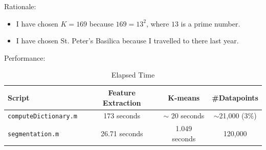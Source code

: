 \documentclass{article}
\begin{document}
Rationale: 
\begin{itemize}\parskip0pt
	\item I have chosen $K=169$ because $169=13^2$, where $13$ is a prime number. 
	\item I have chosen St. Peter's Basilica because I travelled to there last year. 
\end{itemize}

Performance: 
\begin{table}[h!]
	\centering
	\caption{Elapsed Time}\vspace{4pt}
	\begin{tabular}{lccc} \toprule
		Script & Feature Extraction & K-means & \#Datapoints \\ \midrule
		\tt computeDictionary.m & 173 seconds & $\sim$ 20 seconds & $\sim$21,000 (3\%) \\ 
		\tt segmentation.m & 26.71 seconds & 1.049 seconds & 120,000 \\ \bottomrule
	\end{tabular}
\end{table}
\end{document}
